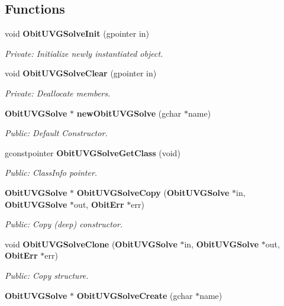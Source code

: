 \subsection*{Functions}
\begin{CompactItemize}
\item 
void {\bf Obit\-UVGSolve\-Init} (gpointer in)
\begin{CompactList}\small\item\em Private: Initialize newly instantiated object. \item\end{CompactList}\item 
void {\bf Obit\-UVGSolve\-Clear} (gpointer in)
\begin{CompactList}\small\item\em Private: Deallocate members. \item\end{CompactList}\item 
{\bf Obit\-UVGSolve} $\ast$ {\bf new\-Obit\-UVGSolve} (gchar $\ast$name)
\begin{CompactList}\small\item\em Public: Default Constructor. \item\end{CompactList}\item 
gconstpointer {\bf Obit\-UVGSolve\-Get\-Class} (void)
\begin{CompactList}\small\item\em Public: Class\-Info pointer. \item\end{CompactList}\item 
{\bf Obit\-UVGSolve} $\ast$ {\bf Obit\-UVGSolve\-Copy} ({\bf Obit\-UVGSolve} $\ast$in, {\bf Obit\-UVGSolve} $\ast$out, {\bf Obit\-Err} $\ast$err)
\begin{CompactList}\small\item\em Public: Copy (deep) constructor. \item\end{CompactList}\item 
void {\bf Obit\-UVGSolve\-Clone} ({\bf Obit\-UVGSolve} $\ast$in, {\bf Obit\-UVGSolve} $\ast$out, {\bf Obit\-Err} $\ast$err)
\begin{CompactList}\small\item\em Public: Copy structure. \item\end{CompactList}\item 
{\bf Obit\-UVGSolve} $\ast$ {\bf Obit\-UVGSolve\-Create} (gchar $\ast$name)

\end{CompactItemize}

